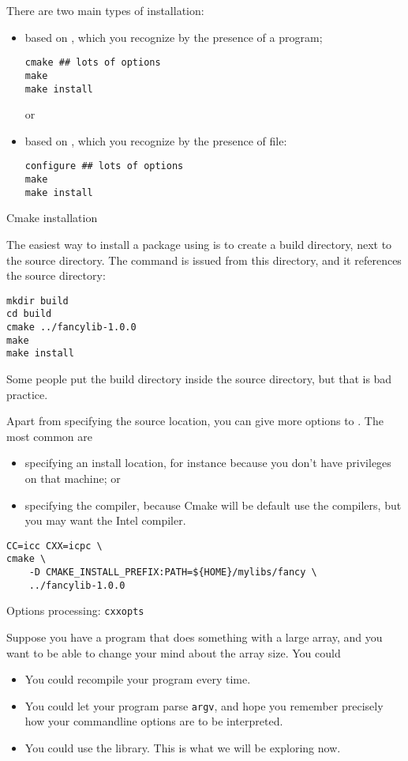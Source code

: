 There are two main types of installation:
\begin{itemize}
\item based on
  ,
  which you recognize by the presence of a  program;
\begin{verbatim}
cmake ## lots of options
make 
make install
\end{verbatim}
or
\item based on ,
  which you recognize by the presence of  file:
\begin{verbatim}
configure ## lots of options
make 
make install
\end{verbatim}
\end{itemize}

 {Cmake installation}

The easiest way to install a package using  is to create a build directory,
next to the source directory. The  command is issued from this directory,
and it references the source directory:
\begin{verbatim}
mkdir build
cd build
cmake ../fancylib-1.0.0
make 
make install
\end{verbatim}
Some people put the build directory inside the source directory,
but that is bad practice.

Apart from specifying the source location,
you can give more options to .
The most common are
\begin{itemize}
\item specifying an install location, for instance because you don't have 
  privileges on that machine; or
\item specifying the compiler, because Cmake will be default use the 
  compilers, but you may want the Intel compiler.
\end{itemize}
\begin{verbatim}
CC=icc CXX=icpc \
cmake \
    -D CMAKE_INSTALL_PREFIX:PATH=${HOME}/mylibs/fancy \
    ../fancylib-1.0.0
\end{verbatim}

 {Options processing: \texttt{cxxopts}}
\label{sec:cxxoptlib}

Suppose you have a program that does something with a large array,
and you want to be able to change your mind about the array size.
You could
\begin{itemize}
\item You could recompile your program every time.
\item You could let your program parse \lstinline{argv}, and hope
  you remember precisely how your commandline options are to be interpreted.
\item You could use the \indextermtt{cxxopts} library.
  This is what we will be exploring now.
\end{itemize}

